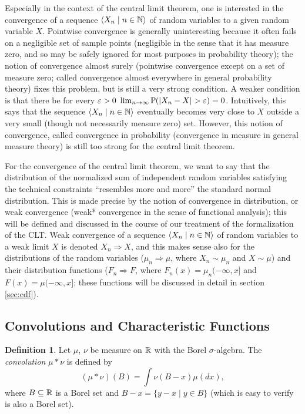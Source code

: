\documentclass{article}
\theoremstyle{definition}
\newtheorem{definition}[theorem]{Definition}
\newcommand{\bldset}[2]{\{{#1}\mid{#2}\}}
\newcommand{\bldseq}[2]{\langle{#1}\mid{#2}\rangle}
\begin{document}
Especially in the context of the central limit theorem, one is interested in the convergence of a sequence $\bldseq{X_n}{n \in \N}$ of random variables to a given random variable $X$. Pointwise convergence is generally uninteresting because it often fails on a negligible set of sample points (negligible in the sense that it has measure zero, and so may be safely ignored for most purposes in probability theory); the notion of convergence almost surely (pointwise convergence except on a set of measure zero; called convergence almost everywhere in general probability theory) fixes this problem, but is still a very strong condition. A weaker condition is that there be for every $\varepsilon > 0$ $\lim_{n \rightarrow \infty} \mathbb{P}(|X_n - X| > \varepsilon) = 0$. Intuitively, this says that the sequence $\bldseq{X_n}{n \in \N}$ eventually becomes very close to $X$ outside a very small (though not necessarily measure zero) set. However, this notion of convergence, called convergence in probability (convergence in measure in general measure theory) is still too strong for the central limit theorem.

For the convergence of the central limit theorem, we want to say that the distribution of the normalized sum of independent random variables satisfying the technical constraints ``resembles more and more'' the standard normal distribution. This is made precise by the notion of convergence in distribution, or weak convergence (weak* convergence in the sense of functional analysis); this will be defined and discussed in the course of our treatment of the formalization of the CLT. Weak convergence of a sequence $\bldseq{X_n}{n \in \N}$ of random variables to a weak limit $X$ is denoted $X_n \Rightarrow X$, and this makes sense also for the distributions of the random variables ($\mu_n \Rightarrow \mu$, where $X_n \sim \mu_n$ and $X \sim \mu$) and their distribution functions ($F_n \Rightarrow F$, where $F_n(x) = \mu_n (-\infty, x]$ and $F(x) = \mu (-\infty, x]$; these functions will be discussed in detail in section \ref{sec:cdf}).

\subsection{Convolutions and Characteristic Functions}

\begin{definition}
Let $\mu$, $\nu$ be measure on $\mathbb{R}$ with the Borel $\sigma$-algebra. The {\em convolution} $\mu * \nu$ is defined by
\[ (\mu * \nu)(B) = \int \nu(B - x) \mu(dx), \]
where $B \subseteq \mathbb{R}$ is a Borel set and $B - x = \bldset{y - x}{y \in B}$ (which is easy to verify is also a Borel set).
\end{definition}
\end{document}
